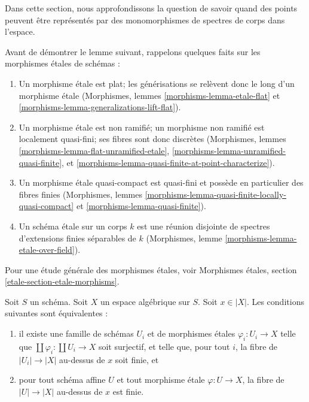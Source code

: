 \noindent
Dans cette section, nous approfondissons la question de savoir quand des
points peuvent être représentés par des monomorphismes de spectres de corps
dans l'espace.

\begin{remark}
\label{remark-recall}
Avant de démontrer le lemme suivant, rappelons quelques faits sur les
morphismes étales de schémas :
\begin{enumerate}
\item Un morphisme étale est plat; les générisations se relèvent donc le long
d'un morphisme étale
(Morphismes, lemmes \ref{morphisms-lemma-etale-flat}
et \ref{morphisms-lemma-generalizations-lift-flat}).
\item Un morphisme étale est non ramifié; un morphisme non ramifié est
localement quasi-fini; ses fibres sont donc discrètes
(Morphismes, lemmes \ref{morphisms-lemma-flat-unramified-etale},
\ref{morphisms-lemma-unramified-quasi-finite}, et
\ref{morphisms-lemma-quasi-finite-at-point-characterize}).
\item Un morphisme étale quasi-compact est quasi-fini et possède en particulier
des fibres finies
(Morphismes, lemmes \ref{morphisms-lemma-quasi-finite-locally-quasi-compact} et
\ref{morphisms-lemma-quasi-finite}).
\item Un schéma étale sur un corps $k$ est une réunion disjointe de spectres
d'extensions finies séparables de $k$
(Morphismes, lemme \ref{morphisms-lemma-etale-over-field}).
\end{enumerate}
Pour une étude générale des morphismes étales, voir
\'Morphismes étales, section \ref{etale-section-etale-morphisms}.
\end{remark}

\begin{lemma}
\label{lemma-U-finite-above-x}
Soit $S$ un schéma. Soit $X$ un espace algébrique sur $S$.
Soit $x \in |X|$. Les conditions suivantes sont équivalentes :
\begin{enumerate}
\item il existe une famille de schémas $U_i$ et de morphismes étales
$\varphi_i : U_i \to X$ telle que
$\coprod \varphi_i : \coprod U_i \to X$ soit surjectif,
et telle que, pour tout $i$, la fibre de
$|U_i| \to |X|$ au-dessus de $x$ soit finie, et
\item pour tout schéma affine $U$ et tout morphisme étale $\varphi : U \to X$,
la fibre de $|U| \to |X|$ au-dessus de $x$ est finie.
\end{enumerate}
\end{lemma}

